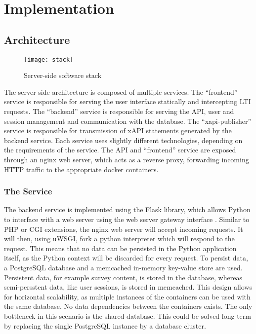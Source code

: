\section{Implementation}
\subsection{Architecture}
    \begin{figure}[H]
        \centering
        \texttt{[image: stack]}
        \caption{Server-side software stack}
        \label{fig:stack}
    \end{figure}

    The server-side architecture is composed of multiple services.
    The ``frontend'' service is responsible for serving the
    user interface statically and intercepting LTI requests.
    The ``backend'' service is responsible for serving the API,
    user and session management and communication with the database.
    The ``xapi-publisher'' service is responsible for transmission
    of xAPI statements generated by the backend service.
    Each service uses slightly different technologies, depending
    on the requirements of the service. The API and ``frontend'' service
    are exposed through an nginx web server, which acts as a reverse
    proxy, forwarding incoming HTTP traffic to the appropriate docker
    containers.

    \subsubsection{The  Service}
        The backend service is implemented using the Flask
        library, which allows Python to interface with a web server
        using the web server gateway interface \cite{pep-333}. Similar
        to PHP or CGI extensions, the nginx web server will accept incoming
        requests. It will then, using uWSGI, fork a python interpreter
        which will respond to the request. This means that no data
        can be persisted in the Python application itself, as the
        Python context will be discarded for every request.
        To persist data, a PostgreSQL database and a memcached
        in-memory key-value store are used.
        Persistent data, for example survey content, is stored
        in the database, whereas semi-persstent data, like user
        sessions, is stored in memcached. This design allows
        for horizontal scalability, as multiple instances of the
         containers can be used with the same database.
        No data dependencies between the  containers
        exists. The only bottleneck in this scenario is the shared database.
        This could be solved long-term by replacing the single PostgreSQL
        instance by a database cluster.

